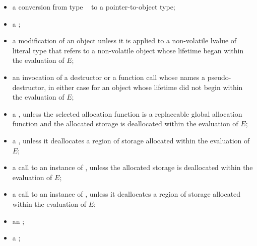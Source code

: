 \begin{itemize}
\begin{note}
\begin{example}
\begin{codeblock}
// OK to capture objects with automatic storage duration created during constant expression evaluation.
static_assert(bind(monad(2))(monad)() == monad(2)());
\end{codeblock}
\end{example}
\end{note}

\item
a conversion from type \cv{}~ to a pointer-to-object type;

\item
a ;

\item
a modification of an object
unless it is applied to a non-volatile lvalue of literal type
that refers to a non-volatile object
whose lifetime began within the evaluation of $E$;

\item
an invocation of a destructor or a function call
whose  names a pseudo-destructor,
in either case for an object whose lifetime did not begin within the evaluation of $E$;

\item
a ,
unless the selected allocation function is
a replaceable global allocation function and
the allocated storage is deallocated within the evaluation of $E$;

\item
a ,
unless it deallocates a region of storage
allocated within the evaluation of $E$;

\item
a call to an instance of
,
unless the allocated storage is deallocated within the evaluation of $E$;

\item
a call to an instance of
,
unless it deallocates a region of storage
allocated within the evaluation of $E$;

\item
an ;

\item
a ;


\end{itemize}
